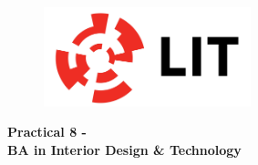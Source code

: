 

\newpage
\setcounter{page}{1}
\begin{center}
	\begin{figure}[ht]
		\centering
		\includegraphics[width = 6cm]{img/LITlogo.jpg}
		\label{fig:logoa8}
	\end{figure}
	\Large\textbf{Practical 8 - }\\
	\large\textbf{BA in Interior Design \& Technology}
\end{center}


